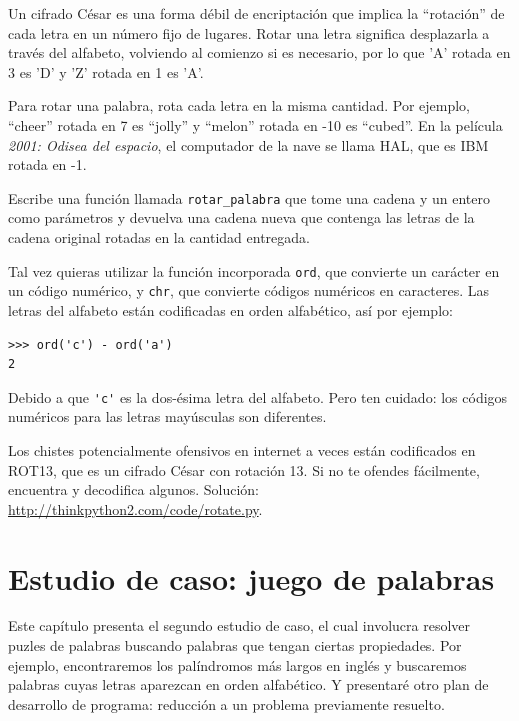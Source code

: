 \documentclass[10pt]{book}
\begin{document}
\begin{exercise}

\label{exrotate}
Un cifrado César es una forma débil de encriptación que implica la ``rotación'' de cada
letra en un número fijo de lugares.  Rotar una letra significa
desplazarla a través del alfabeto, volviendo al comienzo si
es necesario, por lo que 'A' rotada en 3 es 'D' y 'Z' rotada en 1 es 'A'.

Para rotar una palabra, rota cada letra en la misma cantidad.
Por ejemplo, ``cheer'' rotada en 7 es ``jolly'' y ``melon'' rotada
en -10 es ``cubed''.  En la película {\em 2001: Odisea del espacio}, el
computador de la nave se llama HAL, que es IBM rotada en -1.


Escribe una función llamada \verb"rotar_palabra"
que tome una cadena y un entero como parámetros y devuelva
una cadena nueva que contenga las letras de la cadena original
rotadas en la cantidad entregada.

Tal vez quieras utilizar la función incorporada {\tt ord}, que convierte
un carácter en un código numérico, y {\tt chr}, que convierte códigos
numéricos en caracteres.  Las letras del alfabeto están codificadas en orden alfabético,
así por ejemplo:

\begin{verbatim}
>>> ord('c') - ord('a')
2
\end{verbatim}

Debido a que \verb"'c'" es la dos-ésima letra del alfabeto.  Pero ten
cuidado: los códigos numéricos para las letras mayúsculas son diferentes.

Los chistes potencialmente ofensivos en internet a veces están codificados en
ROT13, que es un cifrado César con rotación 13.  Si no te
ofendes fácilmente, encuentra y decodifica algunos.  Solución:
\url{http://thinkpython2.com/code/rotate.py}.

\end{exercise}


\chapter{Estudio de caso: juego de palabras}
\label{wordplay}

Este capítulo presenta el segundo estudio de caso, el cual involucra
resolver puzles de palabras buscando palabras que tengan ciertas
propiedades.  Por ejemplo, encontraremos los palíndromos más largos
en inglés y buscaremos palabras cuyas letras aparezcan en
orden alfabético.  Y presentaré otro plan de desarrollo de
programa: reducción a un problema previamente resuelto.
\end{document}
